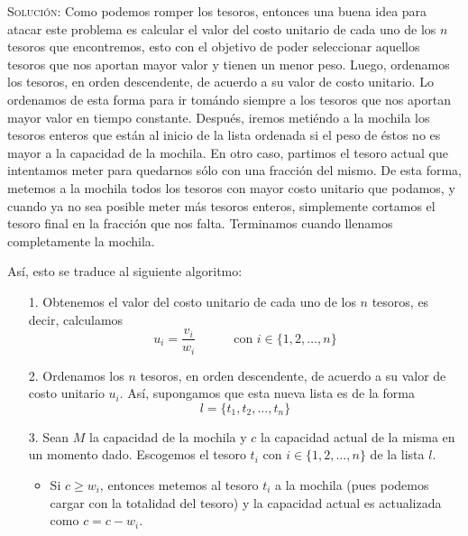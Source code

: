 \documentclass[letterpaper,11pt]{article}
\begin{document}
\begin{enumerate}
\begin{itemize}
        \textsc{Solución:} Como podemos romper los tesoros, entonces una buena 
        idea para atacar este problema es calcular el valor del costo unitario 
        de cada uno de los $n$ tesoros que encontremos, esto con el objetivo 
        de poder seleccionar aquellos tesoros que nos aportan mayor valor y 
        tienen un menor peso. Luego, ordenamos los tesoros, en orden 
        descendente, de acuerdo a su valor de costo unitario. Lo ordenamos de 
        esta forma para ir tomándo siempre a los tesoros que nos aportan 
        mayor valor en tiempo constante. Después, iremos metiéndo a la mochila 
        los tesoros enteros que están al inicio de la lista ordenada si el 
        peso de éstos no es mayor a la capacidad de la mochila. En otro caso, 
        partimos el tesoro actual que intentamos meter para quedarnos sólo con 
        una fracción del mismo. De esta forma, metemos a la mochila todos los 
        tesoros con mayor costo unitario que podamos, y cuando ya no sea posible
        meter más tesoros enteros, simplemente cortamos el tesoro final en la 
        fracción que nos falta. Terminamos cuando llenamos completamente la 
        mochila.

        Así, esto se traduce al siguiente algoritmo:
        \begin{itemize}
            \item[1.] Obtenemos el valor del costo unitario de cada uno de los 
            $n$ tesoros, es decir, calculamos 
            \begin{equation*}
                u_i = \frac{v_i}{w_i} \quad \quad \quad
                \text{con } i \in \{1, 2, \ldots, n\}
            \end{equation*}

            \item[2.] Ordenamos los $n$ tesoros, en orden descendente, de 
            acuerdo a su valor de costo unitario $u_i$. Así, supongamos que 
            esta nueva lista es de la forma 
            \begin{equation*}
                l = \{t_1, t_2, \ldots, t_n\}
            \end{equation*}

            \item[3.] Sean $M$ la capacidad de la mochila y $c$ la capacidad 
            actual de la misma en un momento dado. Escogemos el tesoro $t_i$
            con $i \in \{1, 2, \ldots, n\}$ de la lista $l$.
            \begin{itemize}
                \item Si $c \geq w_i$, entonces metemos al tesoro $t_i$ a la 
                mochila (pues podemos cargar con la totalidad del tesoro) y 
                la capacidad actual es actualizada como $c = c - w_i$.


\end{itemize}
\end{itemize}
\end{itemize}
\end{enumerate}
\end{document}
